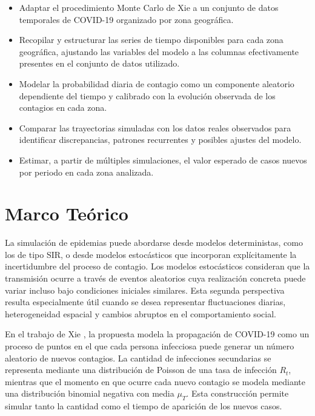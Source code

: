 \documentclass[12pt]{article}
\begin{document}
\begin{itemize}
  \item Adaptar el procedimiento Monte Carlo de Xie \cite{Xie2020} a un
        conjunto de datos temporales de COVID-19 organizado por zona geográfica.
  \item Recopilar y estructurar las series de tiempo disponibles para cada
        zona geográfica, ajustando las variables del modelo a las columnas
        efectivamente presentes en el conjunto de datos utilizado.
  \item Modelar la probabilidad diaria de contagio como un componente aleatorio
        dependiente del tiempo y calibrado con la evolución observada de los
        contagios en cada zona.
  \item Comparar las trayectorias simuladas con los datos reales observados
        para identificar discrepancias, patrones recurrentes y posibles ajustes
        del modelo.
  \item Estimar, a partir de múltiples simulaciones, el valor esperado de
        casos nuevos por periodo en cada zona analizada.
\end{itemize}

\newpage

\section{Marco Teórico}

La simulación de epidemias puede abordarse desde modelos deterministas, como
los de tipo SIR, o desde modelos estocásticos que incorporan explícitamente la
incertidumbre del proceso de contagio.
Los modelos estocásticos consideran que la transmisión
ocurre a través de eventos aleatorios cuya realización concreta puede variar
incluso bajo condiciones iniciales similares. Esta segunda perspectiva resulta
especialmente útil cuando se desea representar fluctuaciones diarias,
heterogeneidad espacial y cambios abruptos en el comportamiento social.

En el trabajo de Xie \cite{Xie2020},
la propuesta modela la propagación de COVID-19 como un proceso de puntos en el
que cada persona infecciosa puede generar un número aleatorio de nuevos
contagios. La cantidad de infecciones secundarias se representa mediante una
distribución de Poisson de una tasa de infección \(R_t\),
mientras que el momento en que ocurre cada nuevo contagio se modela mediante
una distribución binomial negativa con media \(\mu_T\). Esta construcción
permite simular tanto la cantidad como el tiempo de aparición de los nuevos
casos.
\end{document}
